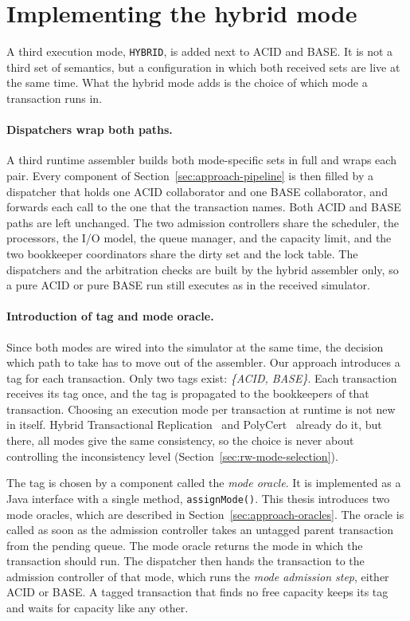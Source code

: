 \section{Implementing the hybrid mode}\label{sec:approach-hybrid}

A third execution mode, \texttt{HYBRID}, is added next to ACID and BASE. It
is not a third set of semantics, but a configuration in which both received
sets are live at the same time. What the hybrid mode adds is the choice of
which mode a transaction runs in.

\paragraph{Dispatchers wrap both paths.}\label{sec:approach-dispatchers} A third
runtime assembler builds both mode-specific sets in full and wraps each pair.
Every component of Section~\ref{sec:approach-pipeline} is then filled by a
dispatcher that holds one ACID collaborator and one BASE collaborator, and
forwards each call to the one that the transaction names. Both ACID and BASE
paths are left unchanged. The two admission controllers share the scheduler, the
processors, the I/O model, the queue manager, and the capacity limit, and the two
bookkeeper coordinators share the dirty set and the lock table. The dispatchers
and the arbitration checks are built by the hybrid assembler only, so a pure
ACID or pure BASE run still executes as in the received simulator.

\paragraph{Introduction of tag and mode
  oracle.}\label{sec:approach-oracle-interface}\label{sec:approach-tag}\label{sec:approach-tagging-point}
Since both modes are wired into the simulator at the same time, the decision
which path to take has to move out of the assembler. Our approach introduces a
tag for each transaction. Only two tags exist: \emph{\{ACID, BASE\}}. Each transaction
receives its tag once, and the tag is propagated to the bookkeepers of that
transaction. Choosing an execution mode per transaction at runtime is not new in
itself. Hybrid Transactional Replication~\cite{kobus2018htr} and
PolyCert~\cite{couceiro2011polycert} already do it, but there, all modes give the
same consistency, so the choice is never about controlling the inconsistency level
(Section~\ref{sec:rw-mode-selection}).

The tag is chosen by a component called the \emph{mode oracle}. It is
implemented as a Java interface with a single method, \texttt{assignMode()}.
This thesis introduces two mode oracles, which are described in
Section~\ref{sec:approach-oracles}. The oracle is called as soon as the
admission controller takes an untagged parent transaction from the pending
queue. The mode oracle returns the mode in which the
transaction should run. The dispatcher then hands the transaction to the
admission controller of that mode, which runs the
\emph{mode admission step}, either ACID or BASE. A tagged transaction that finds
no free capacity keeps its tag and waits for capacity like any other.

